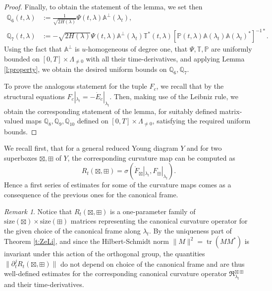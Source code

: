 \documentclass[11pt,a4paper]{article}
\theoremstyle{plain}
\theoremstyle{definition}
\theoremstyle{remark}
\newtheorem{remark}[theorem]{Remark}
\numberwithin{equation}{section}
\newcommand{\A}{\mathbb{A}}
\renewcommand{\P}{\mathbb{P}}
\newcommand{\Q}{\mathbb{Q}}
\newcommand{\size}{\mathrm{size}}
\DeclareMathOperator{\tr}{\mathrm{tr}}
\begin{document}
\begin{proof}
Finally, to obtain the statement of the lemma, we set then
\begin{align}
\Q_6(t,\lambda) & := \frac{1}{\sqrt{2H(\lambda)}}\Psi(t,\lambda) \A^\perp(\lambda_t), \\
\Q_7(t,\lambda) & :=  -\sqrt{2H(\lambda)}\Psi(t,\lambda)\A^\perp(\lambda_t)\mathbb{T}^*(t,\lambda)\left[\P(t,\lambda)\A(\lambda_t)\A(\lambda_t)^*\right]^{-1*}.
\end{align}
Using the fact that $\A^\perp$ is $u$-homogeneous of degree one, that $\Psi,\mathbb{T},\P$ are uniformly bounded on $[0,T]\times \Lambda_{\neq 0}$ with all their time-derivatives, and applying Lemma \ref{l:property}, we obtain the desired uniform bounds on $\Q_6,\Q_7$.

To prove the analogous statement for the tuple $F_c$, we recall that by the structural equations
$F_c|_{\lambda_t} = -\dot{E}_c|_{\lambda_t}$. Then, making use of the Leibniz rule, we obtain the corresponding statement of the lemma, for suitably defined matrix-valued maps $\Q_8,\Q_9,\Q_{10}$ defined on $[0,T]\times \Lambda_{\neq 0}$, satisfying the required uniform bounds.
\end{proof}

We recall first, that for a general reduced Young diagram $Y$ and for two superboxes $\boxtimes,\boxplus$ of $Y$, the corresponding curvature map can be computed as
\begin{equation}
R_t(\boxtimes,\boxplus) = \sigma(\dot{F}_{\boxtimes}|_{\lambda_t},F_{\boxplus}|_{\lambda_t}).
\end{equation}
Hence a first series of estimates for some of the curvature maps comes as a consequence of the previous ones for the canonical frame. 


\begin{remark}\label{rmk:hilbert-schmidt}
Notice that $R_{t}(\boxtimes,\boxplus)$ is a one-parameter family of $\size(\boxtimes)\times \size(\boxplus)$ matrices representing the canonical curvature operator for the given choice of the canonical frame along $\lambda_t$. By the uniqueness part of Theorem \ref{t:ZeLi}, and since the Hilbert-Schmidt norm $\|M\|^2=\tr(MM^*)$ is invariant under this action of the orthogonal group, the quantities $\|\partial_t^j R_t(\boxtimes,\boxplus)\|$ do not depend on choice of the canonical frame and are thus well-defined estimates for the corresponding canonical curvature operator $\mathfrak{R}_{\lambda_t}^{\boxtimes\boxplus}$ and their time-derivatives.
\end{remark}
\end{document}
